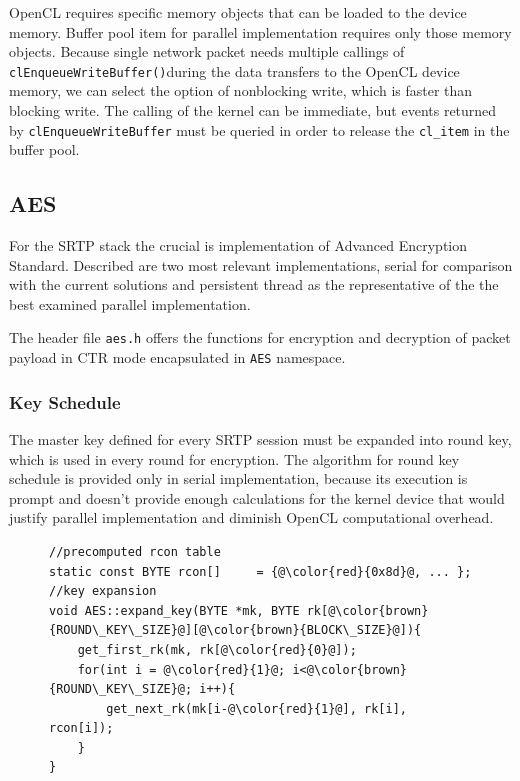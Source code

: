 OpenCL requires specific memory objects that can be loaded to the device memory.
Buffer pool item for parallel implementation requires only those memory objects.
Because single network packet needs multiple callings of 
\texttt{clEnqueueWriteBuffer()}during the data transfers to the OpenCL device 
memory, we can select the option of nonblocking write, which is faster than 
blocking write. The calling of the kernel can be immediate, but events returned 
by \texttt{clEnqueueWriteBuffer} must be queried in order to release the 
\texttt{cl\_item} in the buffer pool. 


\subsection{AES}
For the SRTP stack the crucial is implementation of Advanced Encryption Standard.
Described are two most relevant implementations, serial for comparison with
the current solutions and persistent thread as the representative of the the
best examined parallel implementation.

The header file \texttt{aes.h} offers the functions for encryption and 
decryption of packet payload in CTR mode encapsulated in \texttt{AES} namespace.

\subsubsection*{Key Schedule}
The master key defined for every SRTP session must be expanded into round key,
which is used in every round for encryption. The algorithm for round key schedule
is provided only in serial implementation, because its execution is prompt and
doesn't provide enough calculations for the kernel device that would justify
parallel implementation and diminish OpenCL computational overhead.

\begin{figure}[H]
\begin{lstlisting}
//precomputed rcon table
static const BYTE rcon[]     = {@\color{red}{0x8d}@, ... };
//key expansion
void AES::expand_key(BYTE *mk, BYTE rk[@\color{brown}{ROUND\_KEY\_SIZE}@][@\color{brown}{BLOCK\_SIZE}@]){
    get_first_rk(mk, rk[@\color{red}{0}@]);
    for(int i = @\color{red}{1}@; i<@\color{brown}{ROUND\_KEY\_SIZE}@; i++){
        get_next_rk(mk[i-@\color{red}{1}@], rk[i], rcon[i]);
    }
}
\end{lstlisting}
\end{figure}

